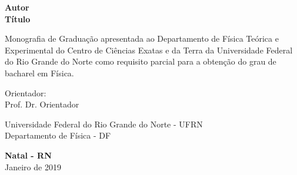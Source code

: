 \documentclass[12pt, a4paper, oneside]{book}
\begin{document}
\begin{center}
	\textbf{\large Autor}\\
	\vspace{2.5cm}
	\textbf{\Large{Título}}
\end{center}
	\vspace{2.2cm}
\begin{flushright}
\begin{minipage}{8cm}
Monografia de Graduação apresentada ao Departamento
de Física Teórica e Experimental do Centro de Ciências Exatas e da Terra da Universidade Federal do Rio Grande do Norte como requisito parcial para a obtenção do grau de bacharel em Física.
\end{minipage}
\end{flushright}
 
\vspace{2cm}

\begin{center}
   \large Orientador: \\
    Prof. Dr. Orientador
\end{center}

\vspace{1cm}

\begin{center}
    Universidade Federal do Rio Grande do Norte - UFRN \\
    Departamento de Física - DF
\end{center}

\vspace{2cm}
\begin{center}
\textbf{Natal - RN} \\
Janeiro de 2019
\end{center}
\end{document}
